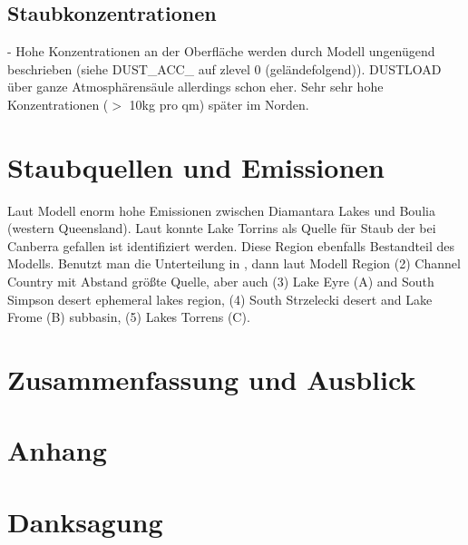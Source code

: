 \documentclass[12pt,a4paper,onecolumn]{scrartcl}
\begin{document}
\subsection{Staubkonzentrationen}
- Hohe Konzentrationen an der Oberfläche werden durch Modell ungenügend beschrieben (siehe DUST_ACC_ auf zlevel 0 (geländefolgend)). DUSTLOAD über ganze Atmosphärensäule allerdings schon eher. Sehr sehr hohe Konzentrationen  ($>$ 10kg pro qm) später im Norden. 
\section{Staubquellen und Emissionen}
Laut Modell enorm hohe Emissionen zwischen Diamantara Lakes und Boulia (western Queensland). Laut \citet{Deckker.2019} konnte Lake Torrins als Quelle für Staub der bei Canberra gefallen ist identifiziert werden. Diese Region ebenfalls Bestandteil des Modells. Benutzt man die Unterteilung in \citet{OLoingsigh.2017}, dann laut Modell Region (2) Channel Country mit Abstand größte Quelle, aber auch (3) Lake Eyre (A) and South Simpson desert ephemeral lakes region, (4) South Strzelecki desert and Lake Frome (B) subbasin, (5) Lakes Torrens (C).
\section{Zusammenfassung und Ausblick}
\newpage
\printbibliography
\newpage
\appendix
\section{Anhang}
\listoffigures
{}
\listoftables
\section{Danksagung}
\end{document}
